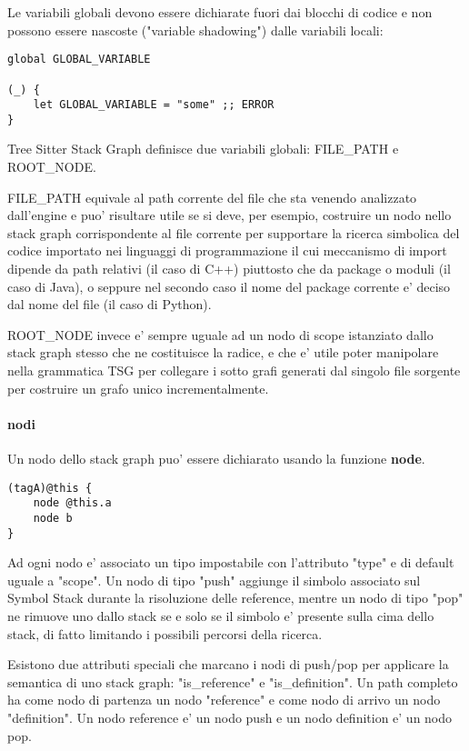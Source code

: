 Le variabili globali devono essere dichiarate fuori dai blocchi di codice e non possono essere nascoste ("variable shadowing") dalle variabili locali:

\begin{verbatim}
global GLOBAL_VARIABLE

(_) {
    let GLOBAL_VARIABLE = "some" ;; ERROR
}
\end{verbatim}

Tree Sitter Stack Graph definisce due variabili globali: FILE\_PATH e ROOT\_NODE.

FILE\_PATH equivale al path corrente del file che sta venendo analizzato dall'engine e puo' risultare utile se si deve, per esempio, costruire un nodo nello stack graph corrispondente al file corrente per supportare la ricerca simbolica del codice importato nei linguaggi di programmazione il cui meccanismo di import dipende da path relativi (il caso di C++) piuttosto che da package o moduli (il caso di Java), o seppure nel secondo caso il nome del package corrente e' deciso dal nome del file (il caso di Python).

ROOT\_NODE invece e' sempre uguale ad un nodo di scope istanziato dallo stack graph stesso che ne costituisce la radice, e che e' utile poter manipolare nella grammatica TSG per collegare i sotto grafi generati dal singolo file sorgente per costruire un grafo unico incrementalmente.

\paragraph{nodi}

Un nodo dello stack graph puo' essere dichiarato usando la funzione \textbf{node}.

\begin{verbatim}
(tagA)@this {
    node @this.a
    node b
}
\end{verbatim}

Ad ogni nodo e' associato un tipo impostabile con l'attributo "type" e di default uguale a "scope".
Un nodo di tipo "push" aggiunge il simbolo associato sul Symbol Stack durante la risoluzione delle reference, mentre un nodo di tipo "pop" ne rimuove uno dallo stack se e solo se il simbolo e' presente sulla cima dello stack, di fatto limitando i possibili percorsi della ricerca.

Esistono due attributi speciali che marcano i nodi di push/pop per applicare la semantica di uno stack graph: "is\_reference" e "is\_definition".
Un path completo ha come nodo di partenza un nodo "reference" e come nodo di arrivo un nodo "definition".
Un nodo reference e' un nodo push e un nodo definition e' un nodo pop.

